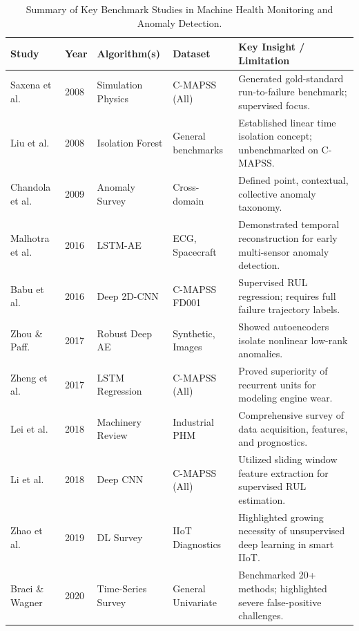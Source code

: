 \documentclass[12pt,a4paper,oneside]{report}
\begin{document}
\begin{table}[htbp]
    \centering
    \small
    \caption{Summary of Key Benchmark Studies in Machine Health Monitoring and Anomaly Detection.}
    \label{tab:lit_review_summary}
    \begin{tabularx}{\textwidth}{p{3.2cm}p{1.2cm}p{2.5cm}p{2.8cm}X}
        \toprule
        \textbf{Study} & \textbf{Year} & \textbf{Algorithm(s)} & \textbf{Dataset} & \textbf{Key Insight / Limitation} \\
        \midrule
        Saxena et al. \cite{saxena2008damage} & 2008 & Simulation Physics & C-MAPSS (All) & Generated gold-standard run-to-failure benchmark; supervised focus. \\
        Liu et al. \cite{liu2008isolation} & 2008 & Isolation Forest & General benchmarks & Established linear time isolation concept; unbenchmarked on C-MAPSS. \\
        Chandola et al. \cite{chandola2009anomaly} & 2009 & Anomaly Survey & Cross-domain & Defined point, contextual, collective anomaly taxonomy. \\
        Malhotra et al. \cite{malhotra2016lstm} & 2016 & LSTM-AE & ECG, Spacecraft & Demonstrated temporal reconstruction for early multi-sensor anomaly detection. \\
        Babu et al. \cite{babu2016deep} & 2016 & Deep 2D-CNN & C-MAPSS FD001 & Supervised RUL regression; requires full failure trajectory labels. \\
        Zhou \& Paff. \cite{zhou2017anomaly} & 2017 & Robust Deep AE & Synthetic, Images & Showed autoencoders isolate nonlinear low-rank anomalies. \\
        Zheng et al. \cite{zheng2017long} & 2017 & LSTM Regression & C-MAPSS (All) & Proved superiority of recurrent units for modeling engine wear. \\
        Lei et al. \cite{lei2018machinery} & 2018 & Machinery Review & Industrial PHM & Comprehensive survey of data acquisition, features, and prognostics. \\
        Li et al. \cite{li2018remaining} & 2018 & Deep CNN & C-MAPSS (All) & Utilized sliding window feature extraction for supervised RUL estimation. \\
        Zhao et al. \cite{zhao2019deep} & 2019 & DL Survey & IIoT Diagnostics & Highlighted growing necessity of unsupervised deep learning in smart IIoT. \\
        Braei \& Wagner \cite{braei2020anomaly} & 2020 & Time-Series Survey & General Univariate & Benchmarked 20+ methods; highlighted severe false-positive challenges. \\
        \bottomrule
    \end{tabularx}
\end{table}
\end{document}
